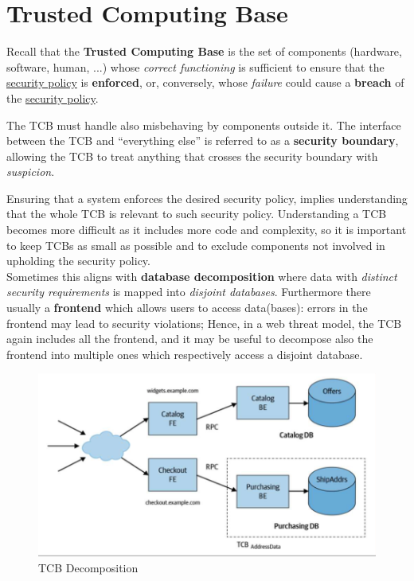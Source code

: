 \section{Trusted Computing Base}
Recall that the \textbf{Trusted Computing Base} is the set of components (hardware, software, human, ...) whose \textit{correct functioning} is sufficient to ensure that the \underline{security policy}
is \textbf{enforced}, or, conversely,
whose \textit{failure} could cause a \textbf{breach} of the \underline{security policy}.

The TCB must handle also misbehaving by components outside it.
The interface between the TCB and “everything else” is referred to as a
\textbf{security boundary},
allowing the TCB to treat anything that crosses the security boundary with
\textit{suspicion}.

Ensuring that a system enforces the desired security policy, implies
understanding that the whole TCB is relevant to such security policy.
Understanding a TCB becomes more difficult as it includes more code
and complexity, 
so it is important to keep TCBs as small as possible and
to exclude components not involved in upholding the security policy.\\
Sometimes this aligns with \textbf{database decomposition} where data with \textit{distinct security requirements} is mapped into \textit{disjoint databases}.
Furthermore there usually a \textbf{frontend} which allows users to access data(bases):
errors in the frontend may lead to security violations;
Hence, in a web threat model, the TCB again includes all the
frontend,
and it may be useful to decompose also the frontend into multiple ones which respectively access a disjoint database.

\begin{figure}[htbp]
   \centering
   \includegraphics{images/tcb_decomposition.png}
   \caption{TCB Decomposition}
   \label{fig:tcb_decomposition}
\end{figure}


